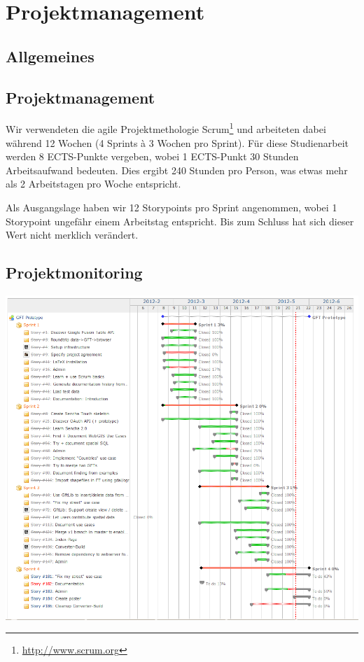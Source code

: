 \chapter{Projektmanagement}

\section{Allgemeines}

\section{Projektmanagement}
Wir verwendeten die agile Projektmethologie Scrum\footnote{\url{http://www.scrum.org}} und arbeiteten dabei während 12 Wochen (4 Sprints à 3 Wochen pro Sprint).
Für diese Studienarbeit werden 8 ECTS-Punkte vergeben, wobei 1 ECTS-Punkt 30 Stunden Arbeitsaufwand bedeuten.
Dies ergibt 240 Stunden pro Person, was etwas mehr als 2 Arbeitstagen pro Woche entspricht.

Als Ausgangslage haben wir 12 Storypoints pro Sprint angenommen, wobei 1 Storypoint ungefähr einem Arbeitstag entspricht. Bis zum Schluss hat sich dieser Wert nicht merklich verändert.











\section{Projektmonitoring}

\includegraphics[scale=0.5]{images/projektmanagement/overall_stories_gantt_chart.png}

